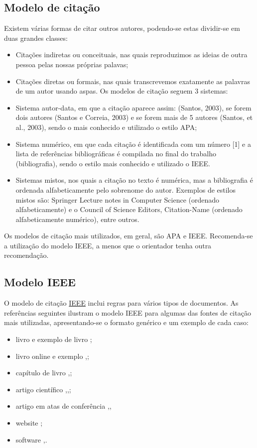 \documentclass[a4paper,twoside,11pt]{report}
\begin{document}
\subsection{Modelo de citação}
Existem várias formas de citar outros autores, podendo-se estas dividir-se em duas grandes classes:
\begin{itemize}
    \item Citações indiretas ou conceituais, nas quais reproduzimos as ideias de outra pessoa pelas nossas próprias palavas;
\item	Citações diretas ou formais, nas quais transcrevemos exatamente as palavras de um autor usando aspas.
Os modelos de citação seguem 3 sistemas:
\item Sistema autor-data, em que a citação aparece assim: (Santos, 2003), se forem dois autores (Santos e Correia, 2003) e se forem mais de 5 autores (Santos, et al., 2003), sendo o mais conhecido e utilizado o estilo APA;
\item Sistema numérico, em que cada citação é identificada com um número [1] e a lista de referências bibliográficas é compilada no final do trabalho (bibliografia), sendo o estilo mais conhecido e utilizado o IEEE.
\item Sistemas mistos, nos quais a citação no texto é numérica, mas a bibliografia é ordenada alfabeticamente pelo sobrenome do autor. Exemplos de estilos mistos são: Springer Lecture notes in Computer Science (ordenado alfabeticamente) e o Council of Science Editors, Citation-Name (ordenado alfabeticamente numérico), entre outros.
\end{itemize}

Os modelos de citação mais utilizados, em geral, são APA e IEEE. Recomenda-se a utilização do modelo IEEE, a menos que o orientador tenha outra recomendação.

\subsection{Modelo IEEE}
O modelo de citação \href{https://ieee-dataport.org/sites/default/files/analysis/27/IEEE\%20Citation\%20Guidelines.pdf}{IEEE} 
inclui regras para vários tipos de documentos. 
As referências seguintes ilustram o modelo IEEE para algumas das fontes de citação mais utilizadas, apresentando-se o formato genérico e um exemplo de cada caso: 

\begin{itemize}
    \item livro \cite{r1} e exemplo de livro \cite{r2}; 
\item 	livro online e exemplo \cite{r3},\cite{r4}; 
\item 	capítulo de livro \cite{r5},\cite{r6}; 
\item 	artigo científico \cite{r7},\cite{r8},\cite{r9};
\item 	artigo em atas de conferência \cite{r10},\cite{r11}, 
\item 	website \cite{r12}; 
\item 	software \cite{r13},\cite{r14}.
\end{itemize}
\end{document}
